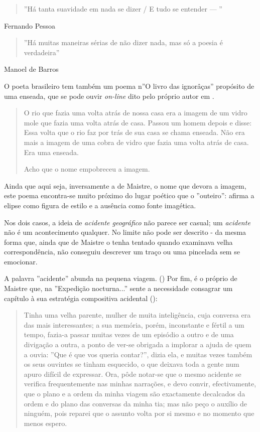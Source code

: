 \documentclass[12pt]{article}
\begin{document}
\begin{quote}
  ''Há tanta suavidade em nada se dizer / E tudo se entender — ''
\end{quote}
Fernando Pessoa \cite{pessoa}


\begin{quote}
''Há muitas maneiras sérias de não dizer nada, mas só a poesia é verdadeira''
\end{quote}
Manoel de Barros \cite{manoelverso}

O poeta brasileiro tem também um poema n''O livro das ignorâças''
propósito de uma enseada, que se pode ouvir \emph{on-line} dito pelo
próprio autor em \cite{avidaebreve}.

\begin{quote}
  O rio que fazia uma volta atrás de nossa casa
era a imagem de um vidro mole que fazia uma
volta atrás de casa.
Passou um homem depois e disse: Essa volta
que o rio faz por trás de sua casa se chama
enseada.
Não era mais a imagem de uma cobra de vidro
que fazia uma volta atrás de casa.
Era uma enseada.

Acho que o nome empobreceu a imagem. 
\end{quote}

Ainda que aqui seja, inversamente a de Maistre, o nome que devora a
imagem, este poema encontra-se muito próximo do lugar poético que o
''outeiro'': afirma a elipse como figura de estilo e a ausência como
fonte imagética.

Nos dois casos, a ideia de \emph{acidente geográfico} não parece ser
casual; um \emph{acidente} não é um acontecimento qualquer. No limite
não pode ser descrito - da mesma forma que, ainda que de Maistre o
tenha tentado quando examinava velha correspondência, não conseguiu
descrever um traço ou uma pincelada sem se
emocionar. \cite[p.xxx?]{demaistre}

A palavra ''acidente'' abunda na pequena viagem. (\cite[pxxx, pxxx,
  pxxx, pxxx, pxxx]{demaistre}) Por fim, é o próprio de Maistre que,
na ''Expedição nocturna...''  sente a necessidade consagrar um
capítulo à sua estratégia compositiva acidental
(\cite[p.xxx?]{demaistre}):

\begin{quote}
  Tinha uma velha parente, mulher de muita inteligência, cuja conversa
  era das mais interessantes; a sua memória, porém, inconstante e
  fértil a um tempo, fazia-a passar muitas vezes de um episódio a
  outro e de uma divigação a outra, a ponto de ver-se obrigada a
  implorar a ajuda de quem a ouvia: ''Que é que vos queria contar?'',
  dizia ela, e muitas vezes também os seus ouvintes se tinham
  esquecido, o que deixava toda a gente num apuro difícil de
  expressar. Ora, pôde notar-se que o mesmo acidente se verifica
  frequentemente nas minhas narrações, e devo convir, efectivamente,
  que o plano e a ordem da minha viagem são exactamente decalcados da
  ordem e do plano das conversas da minha tia; mas não peço o auxílio
  de ninguém, pois reparei que o assunto volta por si mesmo e no
  momento que menos espero.
\end{quote}
\end{document}
